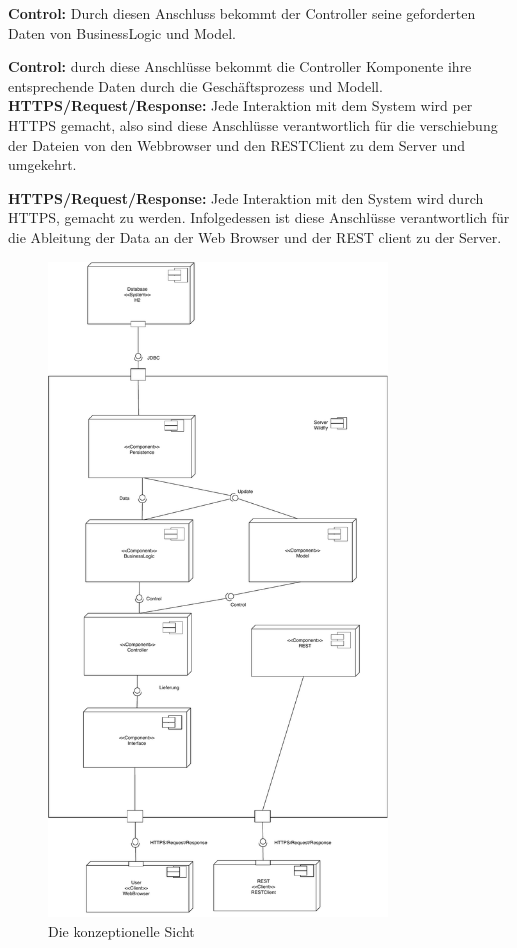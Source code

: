 \documentclass[enabledeprecatedfontcommands,fontsize=12pt,paper=a4,twoside]{scrartcl}
\begin{document}
{%
\textbf{Control:} Durch diesen Anschluss bekommt der Controller seine geforderten Daten von BusinessLogic und Model. 
}

\textbf{Control:} durch diese Anschlüsse bekommt die Controller Komponente ihre entsprechende Daten durch die Geschäftsprozess und Modell.\\

{%
\textbf{HTTPS/Request/Response:} Jede Interaktion mit dem System wird per HTTPS gemacht, also sind diese Anschlüsse verantwortlich für die verschiebung der Dateien von den Webbrowser und den RESTClient zu dem Server und umgekehrt.
}

\textbf{HTTPS/Request/Response:} Jede  Interaktion mit den System wird durch HTTPS, gemacht zu werden. Infolgedessen ist diese Anschlüsse verantwortlich für die Ableitung der Data an der Web Browser und der REST client zu der Server.\\
\newpage

\begin{figure}[H]
\begin{center}
  \includegraphics[width=340px]{UML/KonzeptioneleSicht.pdf}
  \caption{Die konzeptionelle Sicht}
  \label{fig:boat1}
\end{center}
\end{figure}
 
\end{document}
